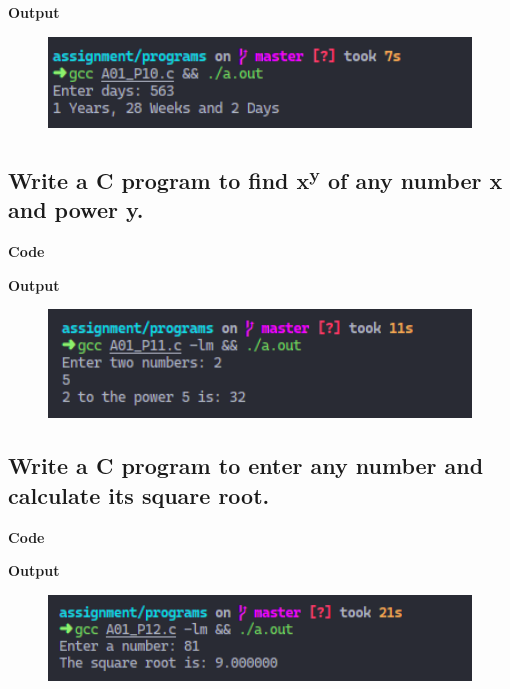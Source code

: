 \documentclass[a4paper]{article}
\begin{document}


\textbf{Output}

\begin{figure}[h]
  \includegraphics[width=12cm]{A01_P10}
\end{figure}

\newpage



\subsection{Write a C program to find x\textsuperscript{y} of any number x and power y.}
\textbf{Code}



\textbf{Output}

\begin{figure}[h]
  \includegraphics[width=12cm]{A01_P11}
\end{figure}

\newpage



\subsection{Write a C program to enter any number and calculate its square root.}
\textbf{Code}



\textbf{Output}

\begin{figure}[h]
  \includegraphics[width=12cm]{A01_P12}
\end{figure}
\end{document}
